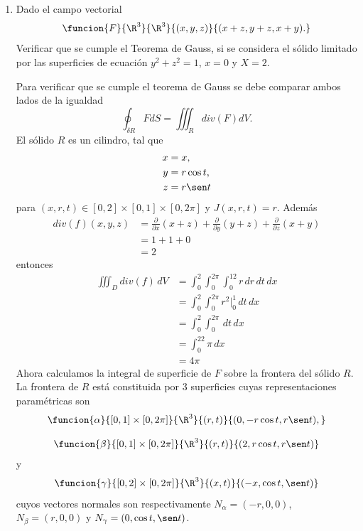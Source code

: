 \documentclass[a4,11pt]{aleph-examen}
\begin{document}
\begin{preguntas}
\begin{respuesta}
\begin{respuesta}
\begin{respuesta}
\begin{enumerate}
\begin{respuesta}
    \noindent Por lo tanto, $\iint_{D}{f\cdot dS}$ es igual a  $\dfrac{9}{2}$.
\end{respuesta}

\item Dado el campo vectorial
    \[
        \funcion{F}{\R^3}{\R^3}{(x,y,z)}{(x+z,y+z,x+y).}
    \]
    Verificar que se cumple el Teorema de Gauss, si se considera el sólido limitado por las superficies de ecuación $y^2+z^2=1$, $x=0$ y $X=2$.

\begin{respuesta} 
    Para verificar que se cumple el teorema de Gauss se debe comparar ambos lados de la igualdad
    \[
        \oint_{\delta R}FdS=\iiint_R div(F)dV.
    \]
	El sólido $R$ es un cilindro, tal que
	\begin{align*}
	    x&=x,\\
	    y&=r\cos t, \\
	    z&=r\sen t 
	\end{align*}
	para $(x,r,t)\in [0,2]\times[0,1]\times[0,2\pi]$ y $J(x,r,t)=r$.
    Además
    \begin{align*}
         div(f)(x,y,z)&=\frac{\partial}{\partial x}(x+z)+\frac{\partial}{\partial y}(y+z)+\frac{\partial}{\partial z}(x+y)\\
         &=1+1+0\\
         &=2
    \end{align*}
    entonces
    \begin{align*}
        \iiint_D div(f)\,dV&=\int_0^2\int_0^{2\pi}\int_0^12r\,dr\,dt\,dx\\
        &=\int_0^2\int_0^{2\pi}r^2|_0^1\,dt \,dx\\
        &=\int_0^2\int_0^{2\pi}\,dt\,dx\\
        &=\int_0^22\pi\,dx\\
        &=4\pi
    \end{align*}
    Ahora calculamos la integral de superficie de $F$ sobre la frontera del sólido $R$. La frontera de $R$ está constituida por 3 superficies cuyas representaciones paramétricas son
    \[
        \funcion{\alpha}{[0,1]\times[0,2\pi]}{\R^3}{(r,t)}{(0,-r\cos t,r\sen t),}
    \]
    
    \[
        \funcion{\beta}{[0,1]\times[0,2\pi]}{\R^3}{(r,t)}{(2,r\cos t,r\sen t)}
    \]
    y
    \[
        \funcion{\gamma}{[0,2]\times[0,2\pi]}{\R^3}{(x,t)}{(-x,\cos t,\sen t)}
    \]
    cuyos vectores normales son respectivamente $N_\alpha=(-r,0,0)$, $N_\beta=(r,0,0)$ y $N_\gamma=(0,\cos t,\sen t)$.
    

\end{respuesta}
\end{enumerate}
\end{respuesta}
\end{respuesta}
\end{respuesta}
\end{preguntas}
\end{document}
